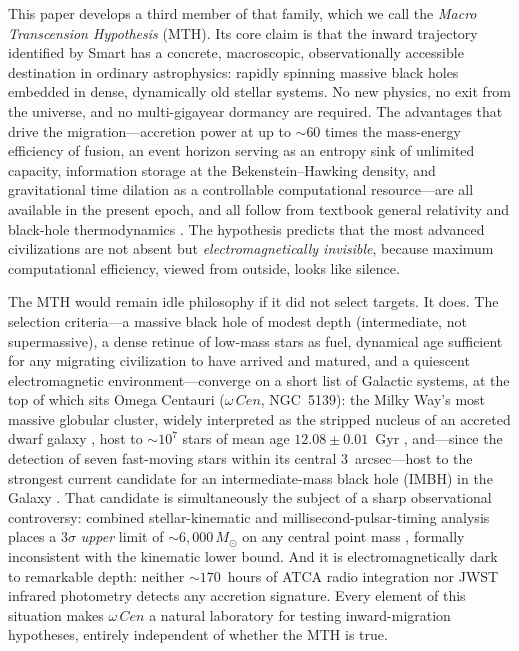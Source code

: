 \documentclass[11pt]{article}
\newcommand{\msun}{M_\odot}
\newcommand{\acen}{\ensuremath{\omega}\,Cen}
\begin{document}
This paper develops a third member of that family, which we call the \emph{Macro Transcension Hypothesis} (MTH). Its core claim is that the inward trajectory identified by Smart has a concrete, macroscopic, observationally accessible destination in ordinary astrophysics: rapidly spinning massive black holes embedded in dense, dynamically old stellar systems. No new physics, no exit from the universe, and no multi-gigayear dormancy are required. The advantages that drive the migration---accretion power at up to ${\sim}60$ times the mass-energy efficiency of fusion, an event horizon serving as an entropy sink of unlimited capacity, information storage at the Bekenstein--Hawking density, and gravitational time dilation as a controllable computational resource---are all available in the present epoch, and all follow from textbook general relativity and black-hole thermodynamics \citep{misner1973,bardeen1972,bekenstein1973,bekenstein1974}. The hypothesis predicts that the most advanced civilizations are not absent but \emph{electromagnetically invisible}, because maximum computational efficiency, viewed from outside, looks like silence.

The MTH would remain idle philosophy if it did not select targets. It does. The selection criteria---a massive black hole of modest depth (intermediate, not supermassive), a dense retinue of low-mass stars as fuel, dynamical age sufficient for any migrating civilization to have arrived and matured, and a quiescent electromagnetic environment---converge on a short list of Galactic systems, at the top of which sits Omega Centauri ($\acen$, NGC~5139): the Milky Way's most massive globular cluster, widely interpreted as the stripped nucleus of an accreted dwarf galaxy \citep{hilker2000,bekki2019,ibata2019}, host to ${\sim}10^{7}$ stars of mean age $12.08\pm0.01$~Gyr \citep{clontz2024}, and---since the detection of seven fast-moving stars within its central 3~arcsec---host to the strongest current candidate for an intermediate-mass black hole (IMBH) in the Galaxy \citep{haberle2024a}. That candidate is simultaneously the subject of a sharp observational controversy: combined stellar-kinematic and millisecond-pulsar-timing analysis places a $3\sigma$ \emph{upper} limit of ${\sim}6{,}000\,\msun$ on any central point mass \citep{banares2025}, formally inconsistent with the kinematic lower bound. And it is electromagnetically dark to remarkable depth: neither ${\sim}170$~hours of ATCA radio integration \citep{mahida2026} nor JWST infrared photometry \citep{chen2025} detects any accretion signature. Every element of this situation makes $\acen$ a natural laboratory for testing inward-migration hypotheses, entirely independent of whether the MTH is true.
\end{document}
